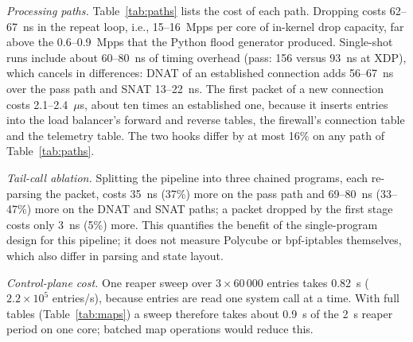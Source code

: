 \documentclass[conference]{IEEEtran}
\begin{document}
\textit{Processing paths.} Table~\ref{tab:paths} lists the cost of each path.
Dropping costs 62--67~ns in the repeat loop, i.e., 15--16~Mpps per core of
in-kernel drop capacity, far above the 0.6--0.9~Mpps that the Python flood
generator produced. Single-shot runs include about 60--80~ns of timing
overhead (pass: 156 versus 93~ns at XDP), which cancels in differences: DNAT of
an established connection adds 56--67~ns over the pass path and SNAT
13--22~ns. The first packet of a new connection costs 2.1--2.4~$\mu$s, about
ten times an established one, because it inserts entries into the load
balancer's forward and reverse tables, the firewall's connection table and the
telemetry table. The two hooks differ by at most 16\% on any path of Table~\ref{tab:paths}.

\textit{Tail-call ablation.} Splitting the pipeline into three chained
programs, each re-parsing the packet, costs 35~ns (37\%) more on the pass
path and 69--80~ns (33--47\%) more on the DNAT and SNAT paths; a packet
dropped by the first stage costs only 3~ns (5\%) more. This quantifies the
benefit of the single-program design for this pipeline; it does not measure
Polycube or bpf-iptables themselves, which also differ in parsing and state
layout.

\textit{Control-plane cost.} One reaper sweep over $3\times60\,000$ entries
takes 0.82~s ($2.2\times10^5$ entries/s), because entries are read one system
call at a time. With full tables (Table~\ref{tab:maps}) a sweep therefore
takes about 0.9~s of the 2~s reaper period on one core; batched map
operations would reduce this.
\end{document}
